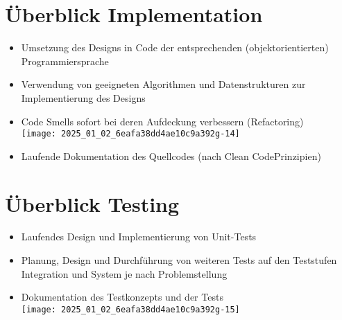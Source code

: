 \section*{Überblick Implementation}
\begin{itemize}
  \item Umsetzung des Designs in Code der entsprechenden (objektorientierten) Programmiersprache
  \item Verwendung von geeigneten Algorithmen und Datenstrukturen zur Implementierung des Designs
  \item Code Smells sofort bei deren Aufdeckung verbessern (Refactoring)\\
\texttt{[image: 2025\_01\_02\_6eafa38dd4ae10c9a392g-14]}
  \item Laufende Dokumentation des Quellcodes (nach Clean CodePrinzipien)
\end{itemize}

\section*{Überblick Testing}
\begin{itemize}
  \item Laufendes Design und Implementierung von Unit-Tests
  \item Planung, Design und Durchführung von weiteren Tests auf den Teststufen Integration und System je nach Problemstellung
  \item Dokumentation des Testkonzepts und der Tests\\
\texttt{[image: 2025\_01\_02\_6eafa38dd4ae10c9a392g-15]}
\end{itemize}
